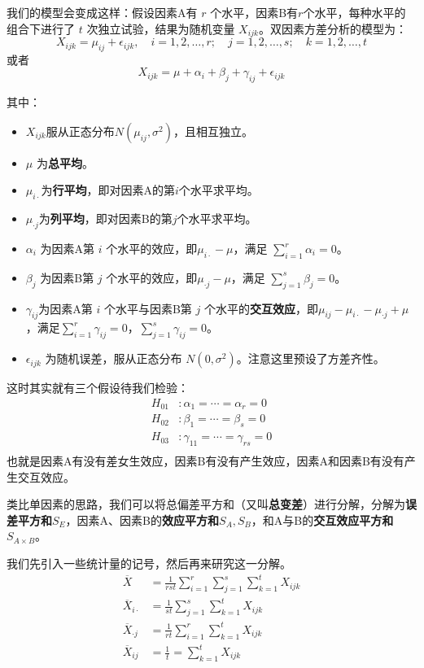 我们的模型会变成这样：假设因素A有 $r$ 个水平，因素B有$r$个水平，每种水平的组合下进行了 $t$ 次独立试验，结果为随机变量 $X_{ijk}$。双因素方差分析的模型为：
\[
X_{ijk}=\mu_{ij}+\epsilon_{ijk},\quad i=1,2,\ldots,r;\quad j=1,2,\ldots,s;\quad k=1,2,\ldots,t
\]
或者
\[
X_{ijk} = \mu + \alpha_i+\beta_j+\gamma_{ij} + \epsilon_{ijk}
\]

其中：
\begin{itemize}
\item $X_{ijk}$服从正态分布$N(\mu_{ij},\sigma^2)$，且相互独立。
\item $\mu$ 为\textbf{总平均}。
\item $\mu_{i\cdot}$为\textbf{行平均}，即对因素A的第$i$个水平求平均。
\item $\mu_{\cdot j}$为\textbf{列平均}，即对因素B的第$j$个水平求平均。
\item $\alpha_i$ 为因素A第 $i$ 个水平的效应，即$\mu_{i\cdot}-\mu$，满足 $\sum_{i=1}^r  \alpha_i = 0$。
\item $\beta_j$ 为因素B第 $j$ 个水平的效应，即$\mu_{\cdot j}-\mu$，满足 $\sum_{j=1}^s \beta_j = 0$。
\item $\gamma_{ij}$为因素A第 $i$ 个水平与因素B第 $j$ 个水平的\textbf{交互效应}，即$\mu_{ij}-\mu_{i\cdot}-\mu_{\cdot j} +\mu$，满足$\sum_{i=1}^r\gamma_{ij}=0$，$\sum_{j=1}^s\gamma_{ij}=0$。
\item $\epsilon_{ijk}$ 为随机误差，服从正态分布 $N(0, \sigma^2)$。注意这里预设了方差齐性。
\end{itemize}

这时其实就有三个假设待我们检验：
\begin{align*}
H_{01}&:\alpha_1=\cdots=\alpha_r=0 \\
H_{02}&:\beta_1=\cdots=\beta_s=0 \\
H_{03}&:\gamma_{11}=\cdots=\gamma_{rs}=0 \\
\end{align*}
也就是因素A有没有差女生效应，因素B有没有产生效应，因素A和因素B有没有产生交互效应。

类比单因素的思路，我们可以将总偏差平方和（又叫\textbf{总变差}）进行分解，分解为\textbf{误差平方和}$S_E$，因素A、因素B的\textbf{效应平方和}$S_A,S_B$，和A与B的\textbf{交互效应平方和}$S_{A\times B}$。

我们先引入一些统计量的记号，然后再来研究这一分解。
\begin{align*}
\overline{X} &= \frac{1}{rst}\sum_{i=1}^r\sum_{j=1}^s\sum_{k=1}^tX_{ijk}\\
\overline{X}_{i\cdot} &= \frac{1}{st}\sum_{j=1}^s\sum_{k=1}^tX_{ijk}\\
\overline{X}_{\cdot j} &= \frac{1}{rt}\sum_{i=1}^r\sum_{k=1}^tX_{ijk}\\
\overline{X}_{ij} &= \frac{1}{t}=\sum_{k=1}^tX_{ijk}\\
\end{align*}

